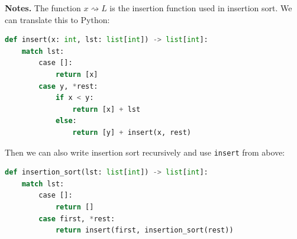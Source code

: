 \documentclass[11pt]{article}
\newcommand{\insertop}{\rightsquigarrow}
\begin{document}
\begin{enumerate}[leftmargin=*]
\textbf{Notes.} The function $x\insertop L$ is the insertion function used in insertion sort. We can translate this to Python:

\begin{lstlisting}[language=Python]
def insert(x: int, lst: list[int]) -> list[int]:
    match lst:
        case []:
            return [x]
        case y, *rest:
            if x < y:
                return [x] + lst
            else:
                return [y] + insert(x, rest)
\end{lstlisting}

Then we can also write insertion sort recursively and use \texttt{insert} from above:

\begin{lstlisting}[language=Python]
def insertion_sort(lst: list[int]) -> list[int]:
    match lst:
        case []:
            return []
        case first, *rest:
            return insert(first, insertion_sort(rest))
\end{lstlisting}

\end{enumerate}
\end{document}
